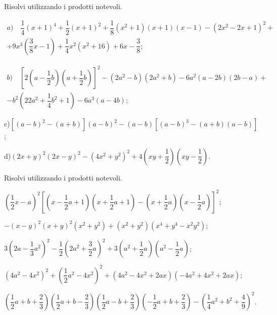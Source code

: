 \begin{esercizio}[\Ast]
 \label{ese:12.44}
Risolvi utilizzando i prodotti notevoli.

 \begin{multline*}
a)\quad \dfrac{1}{4}(x+1)^{4}+\dfrac{1}{2}(x+1)^{2}+\dfrac{1}{8}\left(x^{2}+1\right)(x+1)(x-1)-\left(2x^{2}-2x+1\right)^{2}+\\
 +9x^{3}\left(\dfrac{3}{8}x-1\right)+\dfrac{1}{4}x^{2}\left(x^{2}+16\right)+6x-\dfrac{3}{8};
 \end{multline*}

 \begin{multline*}
b)\quad \left[2\left(a-\dfrac{1}{2}b\right)\left(a+\dfrac{1}{2}b\right)\right]^{2}-\left(2a^{2}-b\right)\left(2a^{2}+b\right)-6a^{2}(a-2b)(2b-a)+\\
 -b^{2}\left(22a^{2}+\dfrac{1}{4}b^{2}+1\right)-6a^{3}(a-4b);
 \end{multline*}
 
 c)\quad $\left[(a-b)^{2}-(a+b)\right](a-b)^{2}-(a-b)\left[(a-b)^{3}-(a+b)(a-b)\right]$;

 d)\quad $(2x+y)^{2}(2x-y)^{2}-\left(4x^{2}+y^{2}\right)^{2}+4\left(xy+\dfrac{1}{2}\right)\left(xy-\dfrac{1}{2}\right)$.
\end{esercizio}

\begin{esercizio}[\Ast]
 \label{ese:12.45}
Risolvi utilizzando i prodotti notevoli.
 \begin{enumeratea}
 \item $\left(\dfrac{1}{2}x-a\right)^{2}\left[\left(x-\dfrac{1}{2}a+1\right)\left(x+\dfrac{1}{2}a+1\right)-\left(x+\dfrac{1}{2}a\right)\left(x-\dfrac{1}{2}a\right)\right]^{2}$;
 \item $-(x-y)^2(x+y)^2\left(x^{2}+y^{2}\right)+\left(x^{2}+y^{2}\right)\left(x^{4}+y^{4}-x^{2}y^{2}\right)$;
 \item $3\left(2a-\dfrac{1}{3}a^{2}\right)^{2}-\dfrac{1}{2}\left(2a^{2}+\dfrac{3}{2}a\right)^{2}+3\left(a^{2}+\dfrac{1}{2}a\right)\left(a^{2}-\dfrac{1}{2}a\right)$;
 \item $\left(4a^{2}-4x^{2}\right)^{2}+\left(\dfrac{1}{2}a^{2}-4x^{2}\right)^{2}+\left(4a^{2}-4x^{2}+2ax\right)\left(-4a^{2}+4x^{2}+2ax\right)$;
 \item $\left(\dfrac{1}{2}a+b+\dfrac{2}{3}\right)\left(\dfrac{1}{2}a+b-\dfrac{2}{3}\right)\left(\dfrac{1}{2}a-b+\dfrac{2}{3}\right)\left(-\dfrac{1}{2}a+b+\dfrac{2}{3}\right)-\left(\dfrac{1}{4}a^{2}+b^{2}+\dfrac{4}{9}\right)^{2}$.
 \end{enumeratea}
\end{esercizio}

